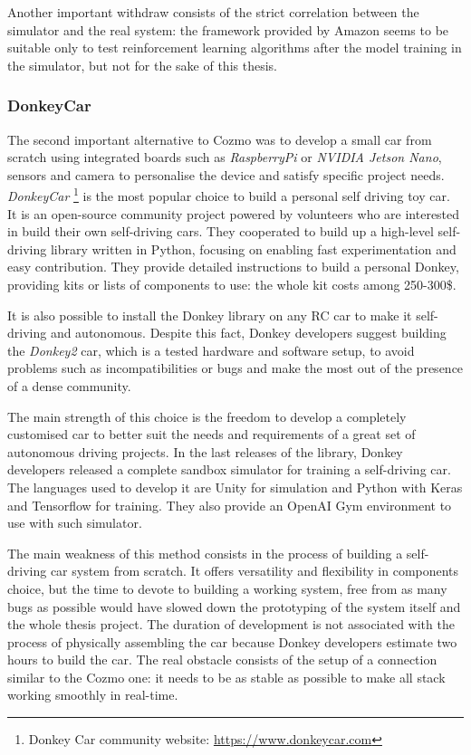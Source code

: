 Another important withdraw consists of the strict correlation between the simulator and the real system: the framework provided by Amazon seems to be suitable only to test reinforcement learning algorithms after the model training in the simulator, but not for the sake of this thesis.

\subsubsection{Donkey\textregistered Car} 

The second important alternative to Cozmo was to develop a small car from scratch using integrated boards such as \textit{RaspberryPi} or \textit{NVIDIA Jetson Nano}, sensors and camera to personalise the device and satisfy specific project needs.
\textit{Donkey\textregistered Car} \footnote{Donkey Car community website: \href{https://www.donkeycar.com}{https://www.donkeycar.com}} is the most popular choice to build a personal self driving toy car. It is an open-source community project powered by volunteers who are interested in build their own self-driving cars. They cooperated to build up a high-level self-driving library written in Python, focusing on enabling fast experimentation and easy contribution. They provide detailed instructions to build a personal Donkey, providing kits or lists of components to use: the whole kit costs among 250-300\$.

It is also possible to install the Donkey library on any RC car to make it self-driving and autonomous. Despite this fact, Donkey developers suggest building the \textit{Donkey2} car, which is a tested hardware and software setup, to avoid problems such as incompatibilities or bugs and make the most out of the presence of a dense community.

The main strength of this choice is the freedom to develop a completely customised car to better suit the needs and requirements of a great set of autonomous driving projects. In the last releases of the library, Donkey developers released a complete sandbox simulator for training a self-driving car. The languages used to develop it are Unity for simulation and Python with Keras and Tensorflow for training. They also provide an OpenAI Gym environment to use with such simulator.

The main weakness of this method consists in the process of building a self-driving car system from scratch. It offers versatility and flexibility in components choice, but the time to devote to building a working system, free from as many bugs as possible would have slowed down the prototyping of the system itself and the whole thesis project. The duration of development is not associated with the process of physically assembling the car because Donkey developers estimate two hours to build the car. The real obstacle consists of the setup of a connection similar to the Cozmo one: it needs to be as stable as possible to make all stack working smoothly in real-time.  

